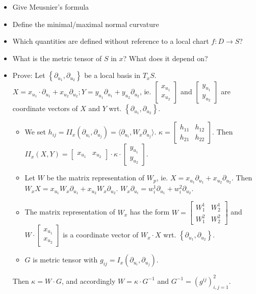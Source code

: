\documentclass{article}
\numberwithin{lecref}{section}
\newcommand{\Set}[1]{\left\{#1\right\}}
\begin{document}
\begin{itemize}
  \item Give Meusnier's formula
  \item Define the minimal/maximal normal curvature
  \item Which quantities are defined without reference to a local chart $f: D \to S$?
  \item What is the metric tensor of $S$ in $x$? What does it depend on?
  \item Prove: Let $\Set{\partial_{u_1}, \partial_{u_2}}$ be a local basis in $T_x S$.
    $X = x_{u_1} \cdot \partial_{u_1} + x_{u_2} \partial_{u_2}; Y = y_{u_1} \partial_{u_1} + y_{u_2} \partial_{u_2}$,
    ie. $\begin{bmatrix} x_{u_1} \\ x_{u_2} \end{bmatrix}$ and $\begin{bmatrix} y_{u_1} \\ y_{u_2} \end{bmatrix}$ are coordinate vectors of $X$ and $Y$ wrt. $\Set{\partial_{u_1}, \partial_{u_2}}$.
    \begin{itemize}
      \item We set $h_{ij} = II_x(\partial_{u_i}, \partial_{u_j}) = \langle \partial_{u_i}, W_x \partial_{u_j}\rangle$. $\kappa = \begin{bmatrix} h_{11} & h_{12} \\ h_{21} & h_{22} \end{bmatrix}$. Then $II_x(X, Y) = \begin{bmatrix} x_{u_1} & x_{u_2} \end{bmatrix} \cdot \kappa \cdot \begin{bmatrix} y_{u_1} \\ y_{u_2} \end{bmatrix}$.
      \item Let $W$ be the matrix representation of $W_p$, ie. $X = x_{u_1} \partial_{u_1} + x_{u_2} \partial_{u_2}$. Then $W_x X = x_{u_1} W_x \partial_{u_1} + x_{u_2} W_x \partial_{u_2}$. $W_x \partial_{u_i} = w_i^1 \partial_{u_1} + w_i^2 \partial_{u_2}$.
      \item The matrix representation of $W_x$ has the form $W = \begin{bmatrix} W_1^1 & W_2^1 \\ W_1^2 & W_2^2 \end{bmatrix}$ and $W \cdot \begin{bmatrix} x_{u_1} \\ x_{u_2} \end{bmatrix}$ is a coordinate vector of $W_x \cdot X$ wrt. $\Set{\partial_{u_1}, \partial_{u_2}}$.
      \item $G$ is metric tensor with $g_{ij} = I_x (\partial_{u_i}, \partial_{u_j})$.
    \end{itemize}
    Then $\kappa = W \cdot G$, and accordingly $W = \kappa \cdot G^{-1}$ and $G^{-1} = (g^{ij})_{i,j=1}^2$.
\end{itemize}
\end{document}
